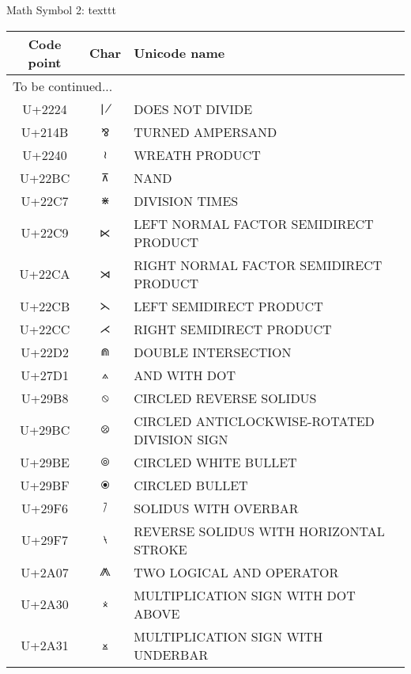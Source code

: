 \documentclass[a4paper]{article}
\begin{document}
{\Large Math Symbol 2: texttt}

\begin{longtable}{ccl}
  \toprule
  Code point & Char & Unicode name \\
  \hline \endhead
  \multicolumn{3}{l}{To be continued...} \\ 
  \midrule \endfoot
  \bottomrule \endlastfoot

  U+2224 & \texttt{∤}  & DOES NOT DIVIDE \\ \hline
  U+214B & \texttt{⅋}  & TURNED AMPERSAND \\ \hline
  U+2240 & \texttt{≀}  & WREATH PRODUCT \\ \hline
  U+22BC & \texttt{⊼}  & NAND \\ \hline
  U+22C7 & \texttt{⋇}  & DIVISION TIMES \\ \hline
  U+22C9 & \texttt{⋉}  & LEFT NORMAL FACTOR SEMIDIRECT PRODUCT \\ \hline
  U+22CA & \texttt{⋊}  & RIGHT NORMAL FACTOR SEMIDIRECT PRODUCT \\ \hline
  U+22CB & \texttt{⋋}  & LEFT SEMIDIRECT PRODUCT \\ \hline
  U+22CC & \texttt{⋌}  & RIGHT SEMIDIRECT PRODUCT \\ \hline
  U+22D2 & \texttt{⋒}  & DOUBLE INTERSECTION \\ \hline
  U+27D1 & \texttt{⟑}  & AND WITH DOT \\ \hline
  U+29B8 & \texttt{⦸}  & CIRCLED REVERSE SOLIDUS \\ \hline
  U+29BC & \texttt{⦼}  & CIRCLED ANTICLOCKWISE-ROTATED DIVISION SIGN \\ \hline
  U+29BE & \texttt{⦾}  & CIRCLED WHITE BULLET \\ \hline
  U+29BF & \texttt{⦿}  & CIRCLED BULLET \\ \hline
  U+29F6 & \texttt{⧶}  & SOLIDUS WITH OVERBAR \\ \hline
  U+29F7 & \texttt{⧷}  & REVERSE SOLIDUS WITH HORIZONTAL STROKE \\ \hline
  U+2A07 & \texttt{⨇}  & TWO LOGICAL AND OPERATOR \\ \hline
  U+2A30 & \texttt{⨰}  & MULTIPLICATION SIGN WITH DOT ABOVE \\ \hline
  U+2A31 & \texttt{⨱}  & MULTIPLICATION SIGN WITH UNDERBAR \\ \hline

\end{longtable}
\end{document}
